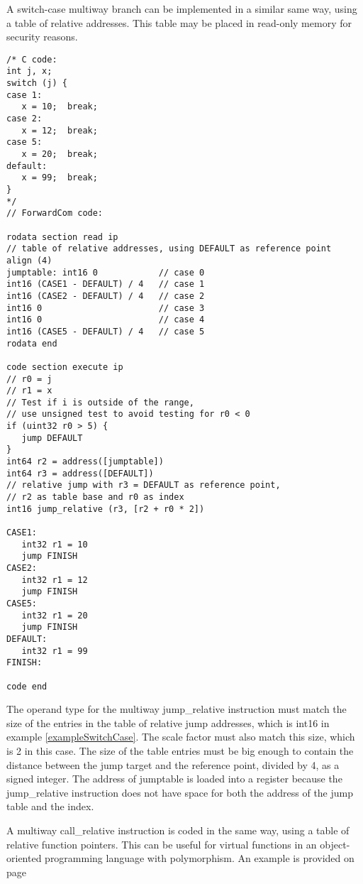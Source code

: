 \documentclass[forwardcom.tex]{subfiles}
\begin{document}
A switch-case multiway branch can be implemented in a similar same way, using a table of relative addresses. This table may be placed in read-only memory for security reasons.
\vv

\begin{example}
\label{exampleSwitchCase}
\end{example}
\begin{lstlisting}[frame=single]
/* C code:
int j, x;
switch (j) {
case 1:
   x = 10;  break;
case 2:
   x = 12;  break;
case 5:   
   x = 20;  break;
default:
   x = 99;  break;
}
*/
// ForwardCom code:

rodata section read ip
// table of relative addresses, using DEFAULT as reference point
align (4)
jumptable: int16 0            // case 0
int16 (CASE1 - DEFAULT) / 4   // case 1
int16 (CASE2 - DEFAULT) / 4   // case 2
int16 0                       // case 3
int16 0                       // case 4
int16 (CASE5 - DEFAULT) / 4   // case 5
rodata end

code section execute ip
// r0 = j
// r1 = x
// Test if i is outside of the range,
// use unsigned test to avoid testing for r0 < 0
if (uint32 r0 > 5) {
   jump DEFAULT
}
int64 r2 = address([jumptable])
int64 r3 = address([DEFAULT])
// relative jump with r3 = DEFAULT as reference point,
// r2 as table base and r0 as index
int16 jump_relative (r3, [r2 + r0 * 2])

CASE1:
   int32 r1 = 10
   jump FINISH
CASE2:
   int32 r1 = 12
   jump FINISH
CASE5:
   int32 r1 = 20
   jump FINISH
DEFAULT:
   int32 r1 = 99
FINISH:

code end
\end{lstlisting}
\vv

The operand type for the multiway jump\_relative instruction must match the size of the entries in the table of relative jump addresses, which is int16 in example \ref{exampleSwitchCase}. The scale factor must also match this size, which is 2 in this case. The size of the table entries must be big enough to contain the distance between the jump target and the reference point, divided by 4, as a signed integer. 
The address of jumptable is loaded into a register because the jump\_relative instruction does not have space for both the address of the jump table and the index.
\vspace{4mm}

A multiway call\_relative instruction is coded in the same way, using a table of relative function pointers. This can be useful for virtual functions in an object-oriented programming language with polymorphism. An example is provided on page \pageref{exampleVirtualFunctions}
\vspace{4mm}
\end{document}
